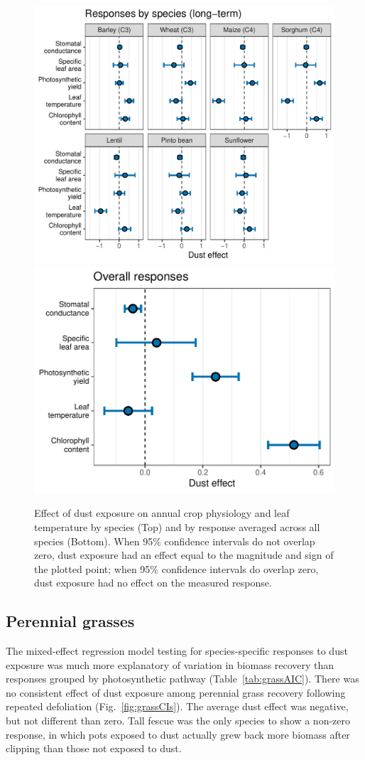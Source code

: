 \documentclass{svjour3}
\begin{document}
\begin{figure}
	 \hspace{0.5em}\includegraphics[width=0.8\linewidth]{figures/lt_spp_gg-1}
	\includegraphics[width=0.75\linewidth]{figures/lt_ov_gg-1}
  \caption{Effect of dust exposure on annual crop physiology and leaf temperature by species (Top) and by response averaged across all species (Bottom). 
  	When 95\% confidence intervals do not overlap zero, dust exposure had an effect equal to the magnitude and sign of the plotted point; when 95\% confidence intervals do overlap zero, dust exposure had no effect on the measured response. \label{fig:lt_cropCIs} }
\end{figure}

\subsection{Perennial grasses} 

The mixed-effect regression model testing for species-specific responses to dust exposure was much more explanatory of variation in biomass recovery than responses grouped by photosynthetic pathway (Table~\ref{tab:grassAIC}).
There was no consistent effect of dust exposure among perennial grass recovery following repeated defoliation (Fig.~\ref{fig:grassCIs}). 
The average dust effect was negative, but not different than zero. 
Tall fescue was the only species to show a non-zero response, in which pots exposed to dust actually grew back more biomass after clipping than those not exposed to dust. 
\end{document}
